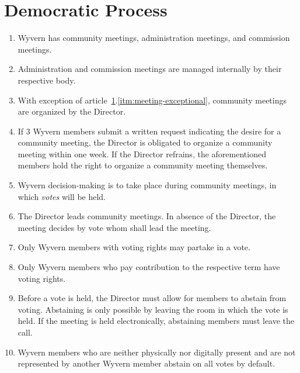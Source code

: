 \section{Democratic Process}
\label{sec:democratic-process}
\begin{enumerate}
    \item Wyvern has community meetings, administration meetings, and commission meetings.
    
    \item Administration and commission meetings are managed internally by their respective body.

    \item With exception of article~\ref{sec:democratic-process}.\ref{itm:meeting-exceptional}, community meetings are organized by the Director.
    
    \item \label{itm:meeting-exceptional} If 3 Wyvern members submit a written request indicating the desire for a community meeting, the Director is obligated to organize a community meeting within one week. If the Director refrains, the aforementioned members hold the right to organize a community meeting themselves.

    \item Wyvern decision-making is to take place during community meetings, in which \emph{votes} will be held.
    
    \item The Director leads community meetings. In absence of the Director, the meeting decides by vote whom shall lead the meeting.

    \item Only Wyvern members with voting rights may partake in a vote.
    
    \item Only Wyvern members who pay contribution to the respective term have voting rights.

    \item Before a vote is held, the Director must allow for members to abstain from voting. Abstaining is only possible by leaving the room in which the vote is held. If the meeting is held electronically, abstaining members must leave the call.
    
    \item Wyvern members who are neither physically nor digitally present and are not represented by another Wyvern member abstain on all votes by default.
    

\end{enumerate}
